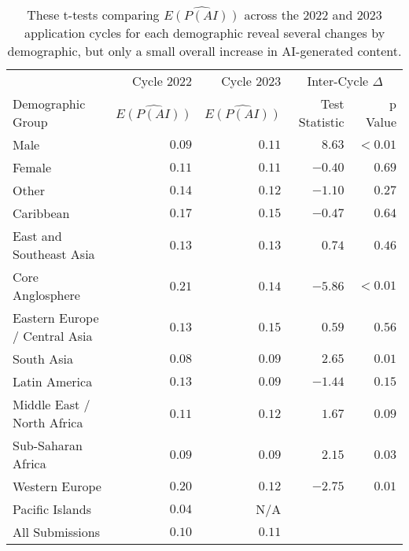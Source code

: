 \begin{table*}[htbp]
  \centering
  \caption{These t-tests comparing $\widehat{E(P(AI))}$ across the 2022 and 2023 application cycles for each demographic reveal several changes by demographic, but only a small overall increase in AI-generated content.}
  \label{tab:demo_means_c23}
  \begin{tabular}{p{} r r r r}
      \toprule
      & Cycle 2022 & Cycle 2023 & \multicolumn{2}{c}{Inter-Cycle $\Delta$} \\
      Demographic Group & $\widehat{E(P(AI))}$ & $\widehat{E(P(AI))}$ & Test Statistic & p Value \\
      \midrule
      Male    & $0.09$ & $0.11$ & $\mathbf{8.63}$ & $\mathbf{<0.01}$ \\
      Female  & $0.11$ & $0.11$ & $-0.40$ & $0.69$ \\
      Other   & $0.14$ & $0.12$ & $-1.10$ & $0.27$ \\
      \midrule
      Caribbean               & $0.17$ & $0.15$ & $-0.47$ & $0.64$ \\
      East and Southeast Asia     & $0.13$ & $0.13$ & $0.74$ & $0.46$ \\
      Core Anglosphere               & $0.21$ & $0.14$ & $\mathbf{-5.86}$ & $\mathbf{<0.01}$ \\
      Eastern Europe / Central Asia     & $0.13$ & $0.15$ & $0.59$ & $0.56$ \\
      South Asia     & $0.08$ & $0.09$ & $\mathbf{2.65}$ & $\mathbf{0.01}$ \\
      Latin America           & $0.13$ & $0.09$ & $-1.44$ & $0.15$ \\
      Middle East / North Africa   & $0.11$ & $0.12$ & $1.67$ & $0.09$ \\
      Sub-Saharan Africa      & $0.09$ & $0.09$ & $\mathbf{2.15}$ & $\mathbf{0.03}$ \\
      Western Europe            & $0.20$ & $0.12$ & $\mathbf{-2.75}$ & $\mathbf{0.01}$ \\
      Pacific Islands         & $0.04$ & N/A      &  &  \\
      \midrule
      All Submissions         &$0.10$ & $0.11$ &  &  \\
      \bottomrule
  \end{tabular}
\end{table*}

